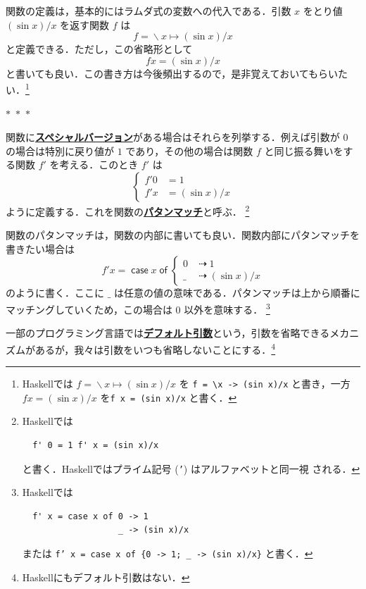 \documentclass[a5paper,twoside,fleqn,draft]{jsbook}
\newcommand{\separator}{\begin{center}$*$~$*$~$*$\end{center}}
\newcommand{\programminglanguage}[1]{\textsf{#1}}
\newcommand{\haskell}{\programminglanguage{Haskell}}
\newcommand{\keyword}[1]{{\underline{\textbf{#1}}}}
\newcommand{\code}[1]{\texttt{#1}}
\newcommand{\mKeyword}[1]{\mathsf{#1}}
\newcommand{\mCaseKeyword}{\mKeyword{case}}
\newcommand{\mOfKeyword}{\mKeyword{of}}
\DeclareMathOperator{\mCaseKW}{\mCaseKeyword}
\DeclareMathOperator{\mOfKW}{\mOfKeyword}
\DeclareMathOperator{\mIfSo}{\dashrightarrow}
\DeclareMathOperator{\mLambda}{\backslash}
\DeclareMathOperator{\mLambdaArrow}{\mapsto}
\newcommand{\mCaseOf}[1]{\mCaseKW#1\mOfKW}
\begin{document}
関数の定義は，基本的にはラムダ式の変数への代入である．引数 $x$ をとり値 $(\sin x)/x$ を返す関数 $f$ は
\begin{equation}
  f
  =\mLambda x\mLambdaArrow(\sin x)/x
\end{equation}
と定義できる．ただし，この省略形として
\begin{equation}
  fx
  =(\sin x)/x
\end{equation}
と書いても良い．この書き方は今後頻出するので，是非覚えておいてもらいたい．\footnote{\haskell では $f=\mLambda x\mLambdaArrow(\sin x)/x$ を \code{f = \textbackslash x -> (sin x)/x} と書き，一方 $fx=(\sin x)/x$ を\code{f x = (sin x)/x} と書く．}

\separator

関数に\keyword{スペシャルバージョン}がある場合はそれらを列挙する．例えば引数が $0$ の場合は特別に戻り値が $1$ であり，その他の場合は関数 $f$ と同じ振る舞いをする関数 $f'$ を考える．このとき $f'$ は
\begin{equation}
  \left\{
  \begin{aligned}
    f'0&=1\\
    f'x&=(\sin x)/x
  \end{aligned}
  \right.
\end{equation}
ように定義する．これを関数の\keyword{パタンマッチ}と呼ぶ．
\footnote{\haskell では
\begin{verbatim}
  f' 0 = 1 f' x = (sin x)/x
\end{verbatim}
と書く．\haskell ではプライム記号 (\code{'}) はアルファベットと同一視
される．}

関数のパタンマッチは，関数の内部に書いても良い．関数内部にパタンマッチを書きたい場合は
\begin{equation}
  f'x=\mCaseOf{x}
  \begin{cases}
    0&\mIfSo1\\
    \_&\mIfSo(\sin x)/x
  \end{cases}
\end{equation}
のように書く．ここに $\_$ は任意の値の意味である．パタンマッチは上から順番にマッチングしていくため，この場合は $0$ 以外を意味する．
\footnote{\haskell では
\begin{verbatim}
  f' x = case x of 0 -> 1
                   _ -> (sin x)/x
\end{verbatim}
または \code{f' x = case x of \{0 -> 1; \_ -> (sin x)/x\}} と書く．}

一部のプログラミング言語では\keyword{デフォルト引数}という，引数を省略できるメカニズムがあるが，我々は引数をいつも省略しないことにする．\footnote{\haskell にもデフォルト引数はない．}
\end{document}
